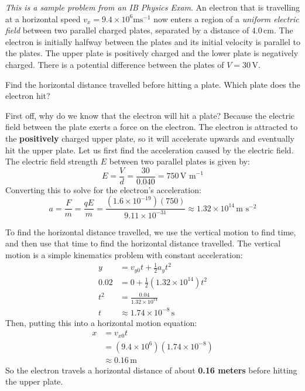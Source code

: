 \begin{Exercise}[title={Electron between Field Plates}, label={ex:electron_field_plates}]
	\textit{This is a sample problem from an IB Physics Exam}.
	An electron that is travelling at a horizontal speed $v_x = 9.4\times10^6 \textrm{ms}^{-1}$ now enters a region of a \textit{uniform electric field} between two parallel charged plates, separated by a distance of $4.0 \, \textrm{cm}$. The electron is initially halfway between the plates and its initial velocity is parallel to the plates. The upper plate is positively charged and the lower plate is negatively charged. There is a potential difference between the plates of $V = 30 \, \textrm{V}$.

	Find the horizontal distance travelled before hitting a plate. Which plate does the electron hit?

\end{Exercise}
\begin{Answer}[ref={ex:electron_field_plates}]
First off, why do we know that the electron will hit a plate? Because the electric field between the plate exerts a force on the electron. The electron is attracted to the \textbf{positively} charged upper plate, so it will accelerate upwards and eventually hit the upper plate. Let us first find the acceleration caused by the electric field. The electric field strength $E$ between two parallel plates is given by:	
\begin{equation}
	E = \frac{V}{d} = \frac{30}{0.040} = 750 \, \textrm{V m}^{-1}
\end{equation}
Converting this to solve for the electron's acceleration:
\begin{equation}
	a = \frac{F}{m} = \frac{qE}{m} = \frac{(1.6\times10^{-19})(750)}{9.11\times10^{-31}} \approx 1.32\times10^{14} \, \textrm{m s}^{-2}
\end{equation}


To find the horizontal distance travelled, we use the vertical motion to find time, and then use that time to find the horizontal distance travelled. The vertical motion is a simple kinematics problem with constant acceleration:
\begin{align*}
	y &= v_{y0}t + \frac{1}{2}a_yt^2 \\
	0.02 &= 0 + \frac{1}{2}(1.32\times10^{14})t^2 \\
	t^2 &= \frac{0.04}{1.32\times10^{14}} \\
	t &\approx 1.74\times10^{-8} \, \textrm{s}	
\end{align*}	
Then, putting this into a horizontal motion equation:
\begin{align*}
	x &= v_{x0}t \\
	&= (9.4\times10^6)(1.74\times10^{-8}) \\
	&\approx 0.16 \, \textrm{m}
\end{align*}
So the electron travels a horizontal distance of about \textbf{0.16 meters} before hitting the upper plate.
\end{Answer}
